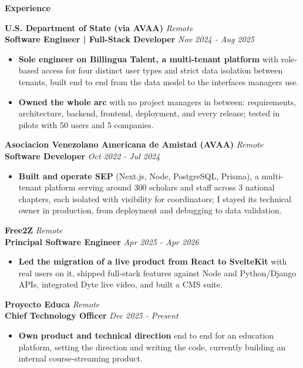 \documentclass[10pt]{article}
\newcommand{\sectiontitle}[1]{%
    \vspace{5pt}
    \begin{center}
        \textbf{#1}
    \end{center}
    \vspace{-6pt}
}
\begin{document}
\sectiontitle{Experience}

\textbf{U.S. Department of State (via AVAA)} \hfill \textit{Remote} \\
\textbf{Software Engineer | Full-Stack Developer} \hfill \textit{Nov 2024 - Aug 2025}
\begin{itemize}
    \item \textbf{Sole engineer on Billingua Talent, a multi-tenant platform} with role-based access for four distinct user types and strict data isolation between tenants, built end to end from the data model to the interfaces managers use.
    \item \textbf{Owned the whole arc} with no project managers in between: requirements, architecture, backend, frontend, deployment, and every release; tested in pilots with 50 users and 5 companies.
\end{itemize}

\vspace{2pt}
\textbf{Asociacion Venezolano Americana de Amistad (AVAA)} \hfill \textit{Remote} \\
\textbf{Software Developer} \hfill \textit{Oct 2022 - Jul 2024}
\begin{itemize}
    \item \textbf{Built and operate SEP} (Next.js, Node, PostgreSQL, Prisma), a multi-tenant platform serving around 300 scholars and staff across 3 national chapters, each isolated with visibility for coordinators; I stayed its technical owner in production, from deployment and debugging to data validation.
\end{itemize}

\vspace{2pt}
\textbf{Free2Z} \hfill \textit{Remote} \\
\textbf{Principal Software Engineer} \hfill \textit{Apr 2025 - Apr 2026}
\begin{itemize}
    \item \textbf{Led the migration of a live product from React to SvelteKit} with real users on it, shipped full-stack features against Node and Python/Django APIs, integrated Dyte live video, and built a CMS suite.
\end{itemize}

\vspace{2pt}
\textbf{Proyecto Educa} \hfill \textit{Remote} \\
\textbf{Chief Technology Officer} \hfill \textit{Dec 2025 - Present}
\begin{itemize}
    \item \textbf{Own product and technical direction} end to end for an education platform, setting the direction and writing the code, currently building an internal course-streaming product.
\end{itemize}
\end{document}
